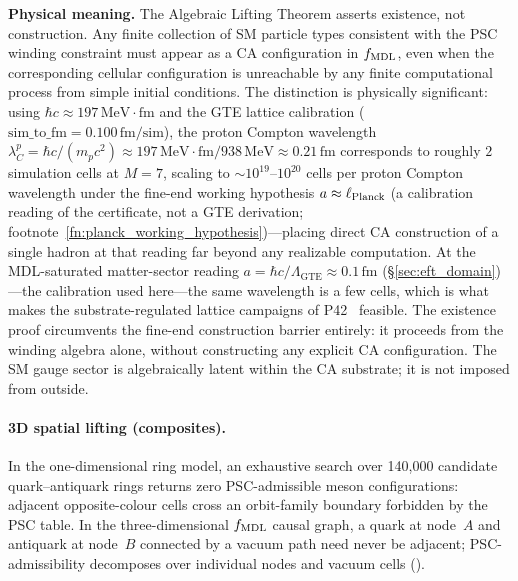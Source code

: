 \noindent\textbf{Physical meaning.}
The Algebraic Lifting Theorem asserts existence, not construction.
Any finite collection of SM particle types consistent with the PSC winding constraint must appear as a CA configuration in $f_{\rm MDL}$, even when the corresponding cellular configuration is unreachable by any finite computational process from simple initial conditions.
The distinction is physically significant: using $\hbar c \approx 197\,\mathrm{MeV{\cdot}fm}$ and the GTE lattice calibration ($\mathrm{sim\_to\_fm} = 0.100\,\mathrm{fm/sim}$), the proton Compton wavelength $\lambda_C^p = \hbar c/(m_p c^2) \approx 197\,\mathrm{MeV{\cdot}fm}/938\,\mathrm{MeV} \approx 0.21\,\mathrm{fm}$ corresponds to roughly $2$ simulation cells at $M=7$, scaling to ${\sim}10^{19}$--$10^{20}$ cells per proton Compton wavelength under the fine-end working hypothesis $a \approx \ell_{\rm Planck}$ (a calibration reading of the certificate, not a GTE derivation; footnote~\ref{fn:planck_working_hypothesis})---placing direct CA construction of a single hadron at that reading far beyond any realizable computation.
At the MDL-saturated matter-sector reading $a = \hbar c/\Lambda_{\mathrm{GTE}} \approx 0.1\,\mathrm{fm}$ (\S\ref{sec:eft_domain})---the calibration used here---the same wavelength is a few cells, which is what makes the substrate-regulated lattice campaigns of P42~\cite{SpivackPhiMDLField} feasible.
The existence proof circumvents the fine-end construction barrier entirely: it proceeds from the winding algebra alone, without constructing any explicit CA configuration.
The SM gauge sector is algebraically latent within the CA substrate; it is not imposed from outside.

\paragraph{3D spatial lifting (composites).}
In the one-dimensional ring model, an exhaustive search over 140{,}000 candidate quark--antiquark rings returns zero PSC-admissible meson configurations: adjacent opposite-colour cells cross an orbit-family boundary forbidden by the PSC table.
In the three-dimensional $f_{\rm MDL}$ causal graph, a quark at node~$A$ and antiquark at node~$B$ connected by a vacuum path need never be adjacent; PSC-admissibility decomposes over individual nodes and vacuum cells ().

